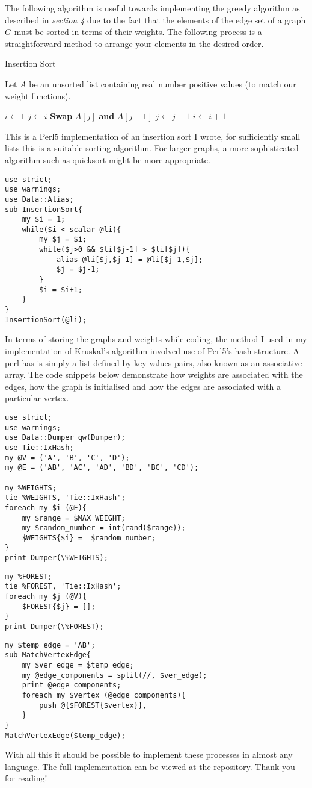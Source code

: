 \documentclass[../main.tex]{subfiles}
\begin{document}
The following algorithm is useful towards implementing the greedy algorithm as described in \textit{section 4} due to the fact that the elements of the edge set of a graph $G$ must be sorted in terms of their weights. The following process is a straightforward method to arrange your elements in the desired order.

\begin{algorithm}[H]
\caption{Insertion Sort\cite{wiki}}\label{sorting}
Let $A$ be an unsorted list containing real number positive values (to match our weight functions).
\begin{algorithmic}[1]
\State $i \gets 1$
\State $j \gets i$
	\State  \textbf{Swap} $A[j]$ \textbf{and} $A[j-1]$
	\State $j \gets j-1$	
	\EndWhile
	\State $i \gets i+1$
\EndWhile
\EndProcedure
\end{algorithmic}
\end{algorithm}
This is a Perl5 implementation of an insertion sort I wrote, for sufficiently small lists this is a suitable sorting algorithm. For larger graphs, a more sophisticated algorithm such as quicksort might be more appropriate.
\begin{lstlisting}
use strict;
use warnings;
use Data::Alias;
sub InsertionSort{
	my $i = 1;
	while($i < scalar @li){
		my $j = $i;
		while($j>0 && $li[$j-1] > $li[$j]){
			alias @li[$j,$j-1] = @li[$j-1,$j];
			$j = $j-1;
		}
		$i = $i+1;
	}
}
InsertionSort(@li);
\end{lstlisting}

In terms of storing the graphs and weights while coding, the method I used in my implementation of Kruskal's algorithm involved use of Perl5's hash structure. A perl has is simply a list defined by key-values pairs, also known as an associative array. The code snippets below demonstrate how weights are associated with the edges, how the graph is initialised and how the edges are associated with a particular vertex.
\pagebreak
\begin{lstlisting}
use strict;
use warnings;
use Data::Dumper qw(Dumper);
use Tie::IxHash;
my @V = ('A', 'B', 'C', 'D');
my @E = ('AB', 'AC', 'AD', 'BD', 'BC', 'CD');

my %WEIGHTS;
tie %WEIGHTS, 'Tie::IxHash';
foreach my $i (@E){
  	my $range = $MAX_WEIGHT;
  	my $random_number = int(rand($range));
	$WEIGHTS{$i} =  $random_number;
}
print Dumper(\%WEIGHTS);
\end{lstlisting}
\begin{lstlisting}
my %FOREST;
tie %FOREST, 'Tie::IxHash';
foreach my $j (@V){
	$FOREST{$j} = [];
}
print Dumper(\%FOREST);
\end{lstlisting}
\begin{lstlisting}
my $temp_edge = 'AB';
sub MatchVertexEdge{
	my $ver_edge = $temp_edge;
	my @edge_components = split(//, $ver_edge);
	print @edge_components;
	foreach my $vertex (@edge_components){
		push @{$FOREST{$vertex}}, 
	}
}
MatchVertexEdge($temp_edge);
\end{lstlisting}

With all this it should be possible to implement these processes in almost any language. The full implementation can be viewed at the repository\cite{github}. Thank you for reading!
\end{document}
